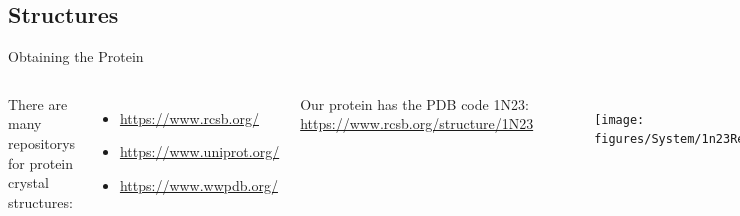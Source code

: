 \subsection{Structures}
\begin{frame}{Obtaining the Protein}
\begin{columns}
There are many repositorys for protein crystal structures:
\begin{itemize}
	\item \href{https://www.rcsb.org/}{https://www.rcsb.org/}
	\item \href{https://www.uniprot.org/}{https://www.uniprot.org/}
	\item \href{https://www.wwpdb.org/}{https://www.wwpdb.org/}
\end{itemize}\vspace{1cm}

Our protein has the PDB code 1N23:
\href{https://www.rcsb.org/structure/1N23}{https://www.rcsb.org/structure/1N23}
\begin{figure}
\texttt{[image: figures/System/1n23Render.png]}
\end{figure}
\end{columns}
\end{frame}

